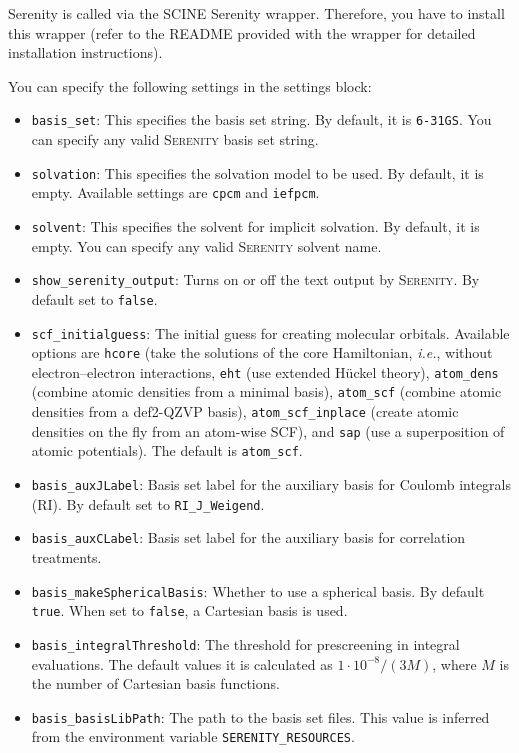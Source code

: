 \documentclass[]{tufte-book}
\begin{document}
Serenity is called via the SCINE Serenity wrapper. Therefore, you have to install this wrapper (refer to the README provided with the wrapper for
detailed installation instructions).

You can specify the following settings in the settings block:
\begin{itemize}
\item \texttt{basis\_set}: This specifies the basis set string. By default, it is \texttt{6-31GS}. You can specify
any valid \textsc{Serenity} basis set string.
\item \texttt{solvation}: This specifies the solvation model to be used. By default, it is empty. Available settings are \texttt{cpcm} and \texttt{iefpcm}.
\item \texttt{solvent}: This specifies the solvent for implicit solvation. By default, it is empty. You can specify any valid \textsc{Serenity} solvent name.
\item \texttt{show\_serenity\_output}: Turns on or off the text output by \textsc{Serenity}. By default set to \texttt{false}.
\item \texttt{scf\_initialguess}: The initial guess for creating molecular orbitals. Available options are \texttt{hcore} (take the solutions of the core Hamiltonian, \textit{i.e.}, without electron--electron interactions, \texttt{eht} (use extended H\"uckel theory), \texttt{atom\_dens} (combine atomic densities from a minimal basis), \texttt{atom\_scf} (combine atomic densities from a def2-QZVP basis), \texttt{atom\_scf\_inplace} (create atomic densities on the fly from an atom-wise SCF), and \texttt{sap} (use a superposition of atomic potentials). The default is \texttt{atom\_scf}.
\item \texttt{basis\_auxJLabel}: Basis set label for the auxiliary basis for Coulomb integrals (RI). By default set to \texttt{RI\_J\_Weigend}.
\item \texttt{basis\_auxCLabel}: Basis set label for the auxiliary basis for correlation treatments. 
\item \texttt{basis\_makeSphericalBasis}: Whether to use a spherical basis. By default \texttt{true}. When set to \texttt{false}, a Cartesian basis is used.
\item \texttt{basis\_integralThreshold}: The threshold for prescreening in integral evaluations. The default values it is calculated as $1\cdot 10^{-8}/(3 M)$, where $M$ is the number of Cartesian basis functions.
\item \texttt{basis\_basisLibPath}: The path to the basis set files. This value is inferred from the environment variable \texttt{SERENITY\_RESOURCES}.

\end{itemize}
\end{document}
